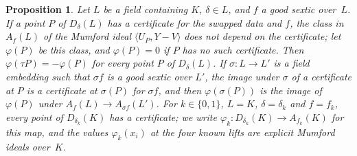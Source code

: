 \documentclass[11pt]{amsart}
\newtheorem{proposition}[theorem]{Proposition}
\theoremstyle{definition}
\numberwithin{equation}{section}
\newcommand{\lean}[1]{\ignorespaces}
\begin{document}
\begin{proposition}\label{prop:abel-prym}\lean{FurioLombardo.Discharge.M3a.AbelPrym.phiRev, FurioLombardo.Discharge.M3a.AbelPrym.phiRev_eq_of_cert, FurioLombardo.Discharge.M3a.AbelPrym.phiRev_inv, FurioLombardo.Discharge.M3a.AbelPrym.Cert.map, FurioLombardo.Discharge.M3a.AbelPrym.phiRev_map, FurioLombardo.Discharge.M3a.Bruin.cert_exists_fRev, FurioLombardo.Discharge.M3a.Bruin.phiK, FurioLombardo.Discharge.M3a.Bruin.phiRev_x0, FurioLombardo.Discharge.M3a.Bruin.phiRev_x1, FurioLombardo.Discharge.M3a.Bruin.phiRev_x2, FurioLombardo.Discharge.M3a.Bruin.phiRev_x3}
Let $L$ be a field containing $K$, $\delta\in L$, and $f$ a good sextic over~$L$. If a point $P$ of $D_\delta(L)$ has a certificate for the swapped data and $f$, the class in $A_f(L)$ of the Mumford ideal $\langle U_P,Y-V\rangle$ does not depend on the certificate; let $\varphi(P)$ be this class, and $\varphi(P)=0$ if $P$ has no such certificate. Then $\varphi(\tau P)=-\varphi(P)$ for every point $P$ of $D_\delta(L)$. If $\sigma:L\to L'$ is a field embedding such that $\sigma f$ is a good sextic over $L'$, the image under $\sigma$ of a certificate at $P$ is a certificate at $\sigma(P)$ for $\sigma f$, and then $\varphi(\sigma(P))$ is the image of $\varphi(P)$ under $A_f(L)\to A_{\sigma f}(L')$. For $k\in\{0,1\}$, $L=K$, $\delta=\delta_k$ and $f=f_k$, every point of $D_{\delta_k}(K)$ has a certificate; we write $\varphi_k:D_{\delta_k}(K)\to A_{f_k}(K)$ for this map, and the values $\varphi_k(x_i)$ at the four known lifts are explicit Mumford ideals over~$K$.
\end{proposition}
\end{document}
